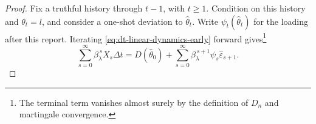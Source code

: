 \documentclass[12pt]{article}
\newcommand{\E}{\mathbb{E}}
\newcommand{\hth}{\hat\theta}
\begin{document}

\begin{proof}
Fix a truthful history through \(t-1\), with \(t\geq1\). Condition
on this history and \(\theta_t=l\), and consider a one-shot deviation
to \(\hth_t\). Write \(\psi_t(\hth_t)\) for the loading after this
report. Iterating \eqref{eq:dt-linear-dynamics-early} forward gives\footnote{The
terminal term vanishes almost surely by the definition of \(D_n\) and
martingale convergence.}
\begin{equation}\label{eq:dt-linear-rep-early}
  \sum_{s=0}^{\infty}\beta_\lambda^{\,s}X_s\Delta t
  =
  D(\hth_0)
  +\sum_{s=0}^{\infty}\beta_\lambda^{\,s+1}\psi_s\hat\varepsilon_{s+1}.
\end{equation}

\end{proof}
\end{document}
